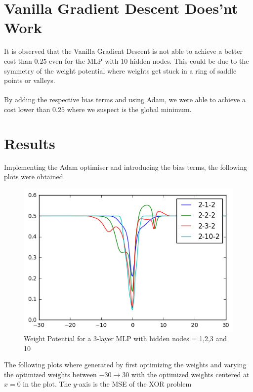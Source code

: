 \documentclass{article}
\begin{document}
\section{Vanilla Gradient Descent Does'nt Work}
It is observed that the Vanilla Gradient Descent is not able to achieve a better cost than $0.25$ even for the MLP with 10 hidden nodes. This could be due to the symmetry of the weight potential where weights get stuck in a ring of saddle points or valleys. \\ \\
By adding the respective bias terms and using Adam, we were able to achieve a cost lower than $0.25$ where we suspect is the global minimum. 
\section{Results}
Implementing the Adam optimiser and introducing the bias terms, the following plots were obtained. 
\begin{figure} [H]
	\begin{center}
	\includegraphics[scale =1]{Convexity_analysis_weight_potential.png}
	\caption{Weight Potential for a 3-layer MLP with hidden nodes = 1,2,3 and 10}
	\end{center}
\end{figure}
The following plots where generated by first optimizing the weights and varying the optimized weights between $-30 \rightarrow 30$ with the optimized weights centered at $x = 0$ in the plot. The $y$-axis is the MSE of the XOR problem
\end{document}

